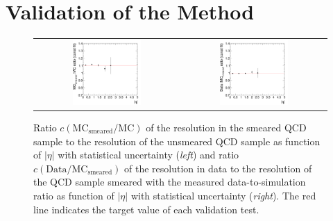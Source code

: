 \section{Validation of the Method}
\label{sec:jer_validation}
\begin{figure}[!tp]
  \centering
  \begin{tabular}{cc}
                \includegraphics[width=0.49\textwidth]{figures/ScalingFactorsVsEta_with_pli_PythiaSmearedVsPythia_v4.pdf} &
                \includegraphics[width=0.49\textwidth]{figures/ScalingFactorsVsEta_with_pli_MCSmearedWithMeasuredValues_final_v4.pdf}
  \end{tabular}
  \caption{Ratio $c\mathrm{(MC_{smeared}/MC)}$ of the resolution in the smeared QCD sample to the resolution of the unsmeared QCD sample as function of $|\eta|$ with statistical uncertainty (\textit{left}) and ratio $c\mathrm{(Data/MC_{smeared})}$ of the resolution in data to the resolution of the QCD sample smeared with the measured data-to-simulation ratio as function of $|\eta|$ with statistical uncertainty (\textit{right}). The red line indicates the target value of each validation test.}
  \label{fig:mc_closure}
\end{figure}
